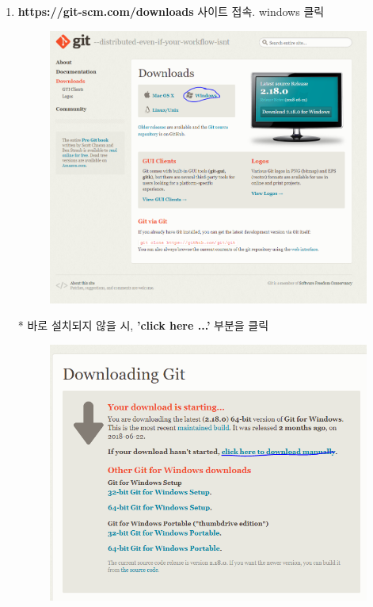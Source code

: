 \documentclass[a4paper]{article}
\begin{document}
	
	\begin{enumerate}
		
		\item \textbf{https://git-scm.com/downloads} 사이트 접속. windows 클릭
		
		\begin{figure}[htbp]
			\begin{center}
				\includegraphics[scale=0.247]{source/install1}
			\end{center}
		\end{figure}
		
		
		
		* 바로 설치되지 않을 시, \textbf{'click here ...'} 부분을 클릭
		
		
		\begin{figure}[htbp]
			\begin{center}
				\includegraphics[scale=0.4]{source/install2}
			\end{center}
		\end{figure}
		

\end{enumerate}
\end{document}
